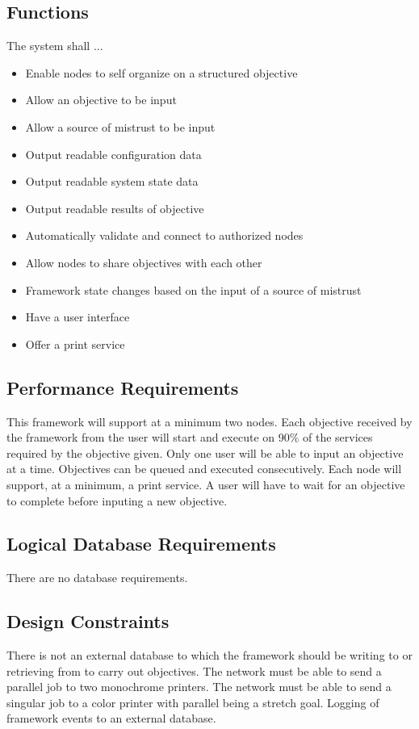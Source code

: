\documentclass[draftclsnofoot, onecolumn, compsoc, 10pt]{IEEEtran}
\begin{document}
\subsection{Functions}
The system shall ...
\begin{itemize}
\item Enable nodes to self organize on a structured objective
\item Allow an objective to be input
\item Allow a source of mistrust to be input
\item Output readable configuration data
\item Output readable system state data
\item Output readable results of objective
\item Automatically validate and connect to authorized nodes
\item Allow nodes to share objectives with each other
\item Framework state changes based on the input of a source of mistrust
\item Have a user interface
\item Offer a print service
\end{itemize}

\subsection{Performance Requirements}
This framework will support at a minimum two nodes. Each objective received by the framework from the user will start and execute on 90\% of the services required by the objective given. Only one user will be able to input an objective at a time. Objectives can be queued and executed consecutively. Each node will support, at a minimum, a print service. A user will have to wait for an objective to complete before inputing a new objective. 

\subsection{Logical Database Requirements}
There are no database requirements. 

\subsection{Design Constraints}
There is not an external database to which the framework should be writing to or retrieving from to carry out objectives. The network must be able to send a parallel job to two monochrome printers. The network must be able to send a singular job to a color printer with parallel being a stretch goal. Logging of framework events to an external database.
\end{document}
